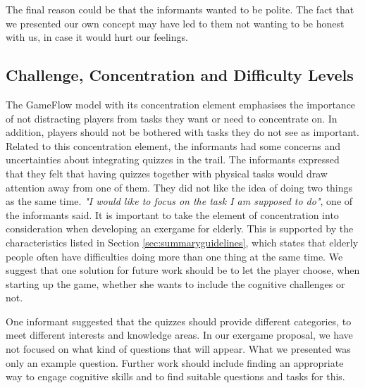The final reason could be that the informants wanted to be polite. The fact that we presented our own concept may have led to them not wanting to be honest with us, in case it would hurt our feelings. 

\subsection{Challenge, Concentration and Difficulty Levels}

The GameFlow model with its concentration element emphasises the importance of not distracting players from tasks they want or need to concentrate on. In addition, players should not be bothered with tasks they do not see as important. Related to this concentration element, the informants had some concerns and uncertainties about integrating quizzes in the trail. The informants expressed that they felt that having quizzes together with physical tasks would draw attention away from one of them. They did not like the idea of doing two things as the same time. \emph{"I would like to focus on the task I am supposed to do"}, one of the informants said. It is important to take the element of concentration into consideration when developing an exergame for elderly. This is supported by the characteristics listed in Section \ref{sec:summaryguidelines}, which states that elderly people often have difficulties doing more than one thing at the same time. We suggest that one solution for future work should be to let the player choose, when starting up the game, whether she wants to include the cognitive challenges or not. 

One informant suggested that the quizzes should provide different categories, to meet different interests and knowledge areas. In our exergame proposal, we have not focused on what kind of questions that will appear. What we presented was only an example question. Further work should include finding an appropriate way to engage cognitive skills and to find suitable questions and tasks for this.

